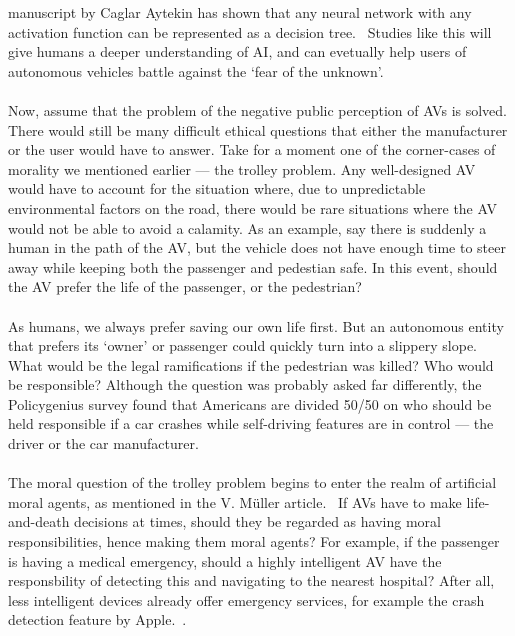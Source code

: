 \documentclass[12pt]{article}
\newcommand{\supercite}[1]{~{\textsuperscript{\cite{#1}}}}
\begin{document}
manuscript by Caglar Aytekin has shown that any neural network with any activation
function can be represented as a decision tree.\supercite{caglar-nn-dt} Studies 
like this will give humans a deeper understanding of AI, and can evetually help
users of autonomous vehicles battle against the `fear of the unknown'.\\
\vspace{0in}\\
Now, assume that the problem of the negative public perception of AVs
is solved. There would still be many difficult ethical questions that either the
manufacturer or the user would have to answer. Take for a moment one of the corner-cases
of morality we mentioned earlier --- the trolley problem. Any well-designed AV
would have to account for the situation where, due to unpredictable environmental
factors on the road, there would be rare situations where the AV would not be
able to avoid a calamity. As an example, say there is suddenly a human in the path
of the AV, but the vehicle does not have enough time to steer away while keeping
both the passenger and pedestian safe. In this event, should the AV prefer the life
of the passenger, or the pedestrian?\\
\vspace{0in}\\
As humans, we always prefer saving our own life first. But an autonomous
entity that prefers its `owner' or passenger could quickly turn into a slippery
slope. What would be the legal ramifications if the pedestrian was killed?
Who would be responsible? Although the question was probably asked far
differently, the Policygenius survey found that Americans are divided 50/50
on who should be held responsible if a car crashes while self-driving 
features are in control — the driver or the car manufacturer.\supercite{policy-genius-survey}\\
\vspace{0in}\\
The moral question of the trolley problem begins to enter the realm of artificial
moral agents, as mentioned in the V. Müller article.\supercite{sep-ethics-ai} If
AVs have to make life-and-death decisions at times, should they be regarded as
having moral responsibilities, hence making them moral agents? For example,
if the passenger is having a medical emergency, should a highly intelligent AV
have the responsbility of detecting this and navigating to the nearest hospital?
After all, less
intelligent devices already offer emergency services,
for example the crash detection feature by Apple.\supercite{apple-crash-detect}.
\end{document}
